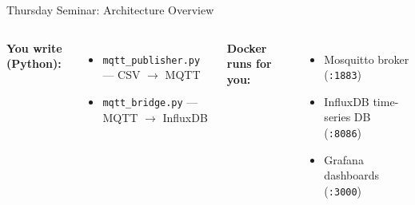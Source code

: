 \documentclass[aspectratio=169,11pt]{beamer}
\begin{document}
\begin{frame}{Thursday Seminar: Architecture Overview}
\begin{center}
\begin{tikzpicture}
    \end{tikzpicture}
    \end{center}

    \vspace{0.1cm}
    \begin{columns}
        \textbf{You write (Python):}
        \begin{itemize}
            \item \texttt{mqtt\_publisher.py} --- CSV $\rightarrow$ MQTT
            \item \texttt{mqtt\_bridge.py} --- MQTT $\rightarrow$ InfluxDB
        \end{itemize}

        \textbf{Docker runs for you:}
        \begin{itemize}
            \item Mosquitto broker (\texttt{:1883})
            \item InfluxDB time-series DB (\texttt{:8086})
            \item Grafana dashboards (\texttt{:3000})
        \end{itemize}
    \end{columns}
\end{frame}
\end{document}
